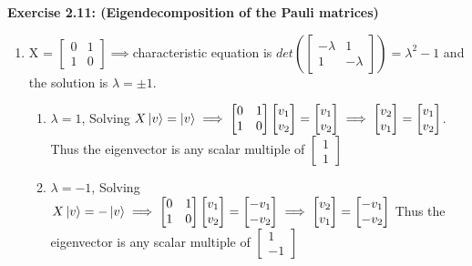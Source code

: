 \documentclass{article}
\begin{document}
\begin{framed}
    \noindent \textbf{Exercise 2.11: (Eigendecomposition of the Pauli matrices)}
    
    \medskip
    \begin{enumerate}
        \item X = $\begin{bmatrix} 0 & 1 \\ 1 & 0 \end{bmatrix} \implies $characteristic equation is $det(\begin{bmatrix} - \lambda & 1 \\ 1 & -\lambda \end{bmatrix}) = \lambda^2 - 1$ and the solution is $\lambda = \pm1$.
        \begin{enumerate}
            \item $\lambda = 1$, Solving $X\ket{v} = \ket{v} \implies \begin{bmatrix} 0 & 1 \\ 1 & 0 \end{bmatrix}\begin{bmatrix} v_1 \\ v_2 \end{bmatrix}=\begin{bmatrix} v_1 \\ v_2 \end{bmatrix} \implies \begin{bmatrix} v_2 \\ v_1 \end{bmatrix}=\begin{bmatrix} v_1 \\ v_2 \end{bmatrix}$. Thus the eigenvector is any scalar multiple of $\begin{bmatrix} 1 \\ 1 \end{bmatrix}$\\
            \item $\lambda = -1$, Solving $X\ket{v} = -\ket{v} \implies \begin{bmatrix} 0 & 1 \\ 1 & 0 \end{bmatrix}\begin{bmatrix} v_1 \\ v_2 \end{bmatrix}=\begin{bmatrix} -v_1 \\ -v_2 \end{bmatrix} \implies \begin{bmatrix} v_2 \\ v_1 \end{bmatrix} = \begin{bmatrix} -v_1 \\ -v_2 \end{bmatrix}$ Thus the eigenvector is any scalar multiple of $\begin{bmatrix} 1 \\ -1 \end{bmatrix}$

\end{enumerate}
\end{enumerate}
\end{framed}
\end{document}
